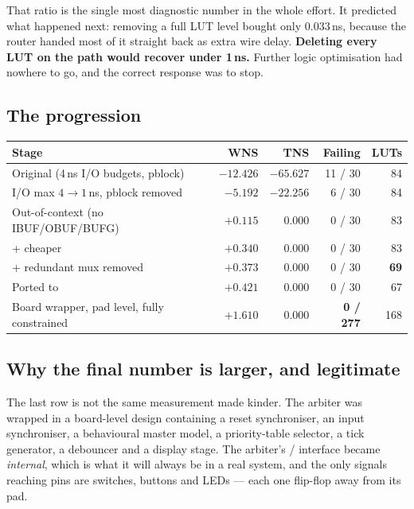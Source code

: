 \documentclass[11pt,a4paper]{article}
\newcommand{\sig}[1]{\texttt{\detokenize{#1}}}
\begin{document}
That ratio is the single most diagnostic number in the whole effort. It predicted
what happened next: removing a full LUT level bought only $0.033$\,ns, because
the router handed most of it straight back as extra wire delay. \textbf{Deleting
every LUT on the path would recover under 1\,ns.} Further logic optimisation had
nowhere to go, and the correct response was to stop.

\subsection{The progression}

\begin{center}
\begin{tabular}{@{}lrrrr@{}}
\toprule
\textbf{Stage} & \textbf{WNS} & \textbf{TNS} & \textbf{Failing} & \textbf{LUTs} \\
\midrule
Original (4\,ns I/O budgets, pblock)      & $-12.426$ & $-65.627$ & 11 / 30 & 84 \\
I/O max $4\rightarrow1$\,ns, pblock removed & $-5.192$ & $-22.256$ & 6 / 30  & 84 \\
Out-of-context (no IBUF/OBUF/BUFG)        & $+0.115$  & $0.000$   & 0 / 30  & 83 \\
\quad + cheaper \sig{is_tie}              & $+0.340$  & $0.000$   & 0 / 30  & 83 \\
\quad + redundant mux removed             & $+0.373$  & $0.000$   & 0 / 30  & \textbf{69} \\
Ported to \sig{xc7a35tcpg236-1}           & $+0.421$  & $0.000$   & 0 / 30  & 67 \\
\midrule
Board wrapper, pad level, fully constrained & $\mathbf{+1.610}$ & $\mathbf{0.000}$ & \textbf{0 / 277} & 168 \\
\bottomrule
\end{tabular}
\end{center}

\subsection{Why the final number is larger, and legitimate}

The last row is not the same measurement made kinder. The arbiter was wrapped in
a board-level design containing a reset synchroniser, an input synchroniser, a
behavioural master model, a priority-table selector, a tick generator, a
debouncer and a display stage. The arbiter's \sig{REQ}/\sig{GRANT} interface
became \emph{internal}, which is what it will always be in a real system, and
the only signals reaching pins are switches, buttons and LEDs --- each one
flip-flop away from its pad.
\end{document}
